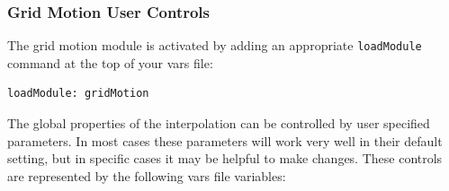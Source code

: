 \subsubsection{Grid Motion User Controls}

The grid motion module is activated by adding an appropriate
{\tt loadModule} command at the top of your vars file:
\begin{verbatim}
loadModule: gridMotion
\end{verbatim}

The global properties of the interpolation can be controlled by user
specified parameters.  In most cases these parameters will work very
well in their default setting, but in specific cases it may be helpful
to make changes.  These controls are represented by the following vars
file variables:

